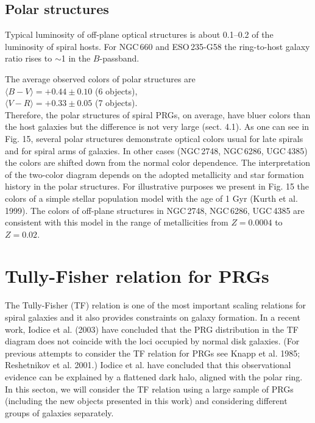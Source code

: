 \documentclass[]{aa}
\begin{document}
\subsection{Polar structures}

Typical luminosity of off-plane optical structures is about
0.1--0.2 of the luminosity of spiral hosts. For NGC\,660 and
ESO\,235-G58 the ring-to-host galaxy ratio rises to $\sim$1 in the
$B$-passband.

The average observed colors of polar structures are \\
\hspace*{1.2cm}$\langle B-V \rangle = +0.44 \pm 0.10$ (6 objects), \\
\hspace*{1.2cm}$\langle V-R \rangle = +0.33 \pm 0.05$ (7 objects). \\
Therefore, the polar structures of spiral PRGs, on average, have
bluer colors than the host galaxies but the difference is
not very large (sect. 4.1). As one can see
in Fig. 15, several polar structures demonstrate optical colors
usual for late spirals and for spiral arms of galaxies. In other
cases (NGC\,2748, NGC\,6286, UGC\,4385) the colors are
shifted down from the normal color dependence. The interpretation
of the two-color diagram depends on the adopted metallicity and
star formation history
in the polar structures. For illustrative purposes we present in Fig. 15 
the colors of a simple stellar population model with the age of
1 Gyr (Kurth et al. 1999). The colors of off-plane
structures in NGC\,2748, NGC\,6286, UGC\,4385 are consistent
with this model in the range of metallicities from $Z=0.0004$ to
$Z=0.02$. 

\section{Tully-Fisher relation for PRGs}

The Tully-Fisher (TF) relation is one of the most important
scaling relations for spiral galaxies and it also provides
constraints on galaxy formation. In a recent work, Iodice et al. (2003)
have concluded that the PRG distribution in the TF diagram does
not coincide with the loci occupied by normal disk galaxies. 
(For previous attempts to consider the TF relation for PRGs see
Knapp et al. 1985; Reshetnikov et al. 2001.) Iodice et al. have
concluded that this observational evidence can be explained by a
flattened dark halo, aligned with the polar ring. 
In this secton, we will consider the TF relation using 
a large sample of PRGs (including the new objects presented in this work)
and considering different groups of galaxies separately. 
\end{document}
